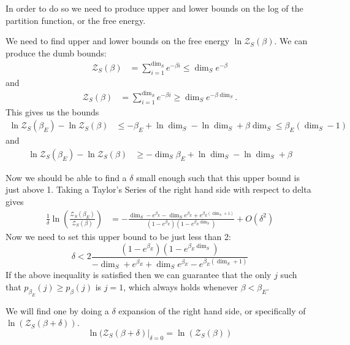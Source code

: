 \documentclass{article}
\newcommand{\parens}[1]{\left( #1 \right)}
\newcommand{\bigo}[1]{O\left( #1 \right)}
\newcommand{\partfun}{\mathcal{Z}}
\begin{document}
In order to do so we need to produce upper and lower bounds on the log of the partition function, or the free energy. 


We need to find upper and lower bounds on the free energy $\ln \partfun_S(\beta)$. We can produce the dumb bounds:
\begin{align}
    \partfun_S(\beta) &= \sum_{i = 1}^{\dim_S} e^{-\beta i} \leq \dim_S e^{-\beta}
\end{align}
and
\begin{align}
    \partfun_S(\beta) &= \sum_{i = 1}^{\dim_S} e^{-\beta i} \geq \dim_S e^{-\beta \dim_S}.
\end{align}
This gives us the bounds
\begin{align}
    \ln \partfun_S(\beta_E) - \ln \partfun_S(\beta) &\leq -\beta_E + \ln \dim_S - \ln \dim_S + \beta \dim_S \leq \beta_E (\dim_S - 1)
\end{align}
and
\begin{align}
    \ln \partfun_S(\beta_E) - \ln \partfun_S(\beta) &\geq - \dim_S \beta_E + \ln \dim_S - \ln \dim_S + \beta
\end{align}

Now we should be able to find a $\delta$ small enough such that this upper bound is just above 1. Taking a Taylor's Series of the right hand side with respect to delta gives
\begin{align}
    \frac{1}{\delta} \ln \parens{\frac{\partfun_S(\beta_E)}{\partfun_S(\beta)}} &= - \frac{\dim_S - e^{\beta_E} - \dim_S e^{\beta_E} + e^{\beta_E (\dim_S +  1)}}{(1 - e^{\beta_E})(1 - e^{\beta_E \dim_S})} + \bigo{\delta^2}
\end{align}
Now we need to set this upper bound to be just less than 2:
\begin{equation}
    \delta < 2 \frac{(1 - e^{\beta_E})(1 - e^{\beta_E \dim_S})}{-\dim_S + e^{\beta_E} + \dim_S e^{\beta_E} - e^{\beta_E (\dim_S +  1)}}
\end{equation}
If the above inequality is satisfied then we can guarantee that the only $j$ such that $p_{\beta_E}(j) \geq p_{\beta}(j)$ is $j = 1$, which always holds whenever $\beta < \beta_E$.


We will find one by doing a $\delta$ expansion of the right hand side, or specifically of $\ln(\partfun_S(\beta + \delta))$.
\begin{equation}
    \ln (\partfun_S(\beta + \delta) \bigg|_{\delta = 0} = \ln (\partfun_S(\beta))
\end{equation}
\end{document}
